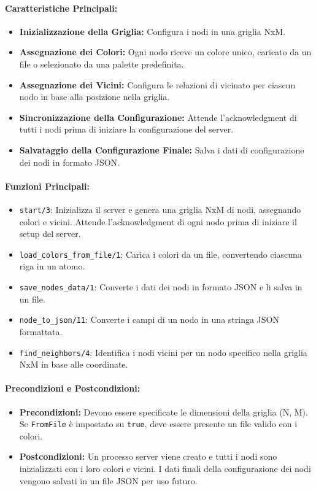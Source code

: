 \documentclass[12pt, a4paper]{report}
\begin{document}
\paragraph{Caratteristiche Principali:}
\begin{itemize}
    \item \textbf{Inizializzazione della Griglia:} Configura i nodi in una griglia NxM.
    \item \textbf{Assegnazione dei Colori:} Ogni nodo riceve un colore unico, caricato da un file o selezionato da una palette predefinita.
    \item \textbf{Assegnazione dei Vicini:} Configura le relazioni di vicinato per ciascun nodo in base alla posizione nella griglia.
    \item \textbf{Sincronizzazione della Configurazione:} Attende l'acknowledgment di tutti i nodi prima di iniziare la configurazione del server.
    \item \textbf{Salvataggio della Configurazione Finale:} Salva i dati di configurazione dei nodi in formato JSON.
\end{itemize}

\paragraph{Funzioni Principali:}
\begin{itemize}
    \item \texttt{start/3}: Inizializza il server e genera una griglia NxM di nodi, assegnando colori e vicini. Attende l'acknowledgment di ogni nodo prima di iniziare il setup del server.
    \item \texttt{load\_colors\_from\_file/1}: Carica i colori da un file, convertendo ciascuna riga in un atomo.
    \item \texttt{save\_nodes\_data/1}: Converte i dati dei nodi in formato JSON e li salva in un file.
    \item \texttt{node\_to\_json/11}: Converte i campi di un nodo in una stringa JSON formattata.
    \item \texttt{find\_neighbors/4}: Identifica i nodi vicini per un nodo specifico nella griglia NxM in base alle coordinate.
\end{itemize}

\paragraph{Precondizioni e Postcondizioni:}
\begin{itemize}
    \item \textbf{Precondizioni:} Devono essere specificate le dimensioni della griglia (N, M). Se \texttt{FromFile} è impostato su \texttt{true}, deve essere presente un file valido con i colori.
    \item \textbf{Postcondizioni:} Un processo server viene creato e tutti i nodi sono inizializzati con i loro colori e vicini. I dati finali della configurazione dei nodi vengono salvati in un file JSON per uso futuro.
\end{itemize}
\end{document}
